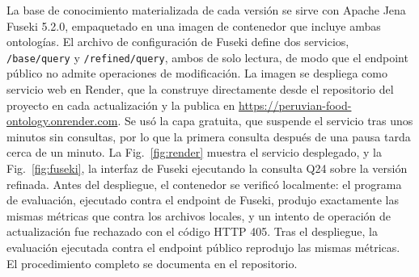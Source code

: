 \documentclass[conference]{IEEEtran}
\begin{document}
La base de conocimiento materializada de cada versión se sirve con Apache Jena Fuseki 5.2.0, empaquetado en una imagen de contenedor que incluye ambas ontologías. El archivo de configuración de Fuseki define dos servicios, \texttt{/base/query} y \texttt{/refined/query}, ambos de solo lectura, de modo que el endpoint público no admite operaciones de modificación. La imagen se despliega como servicio web en Render, que la construye directamente desde el repositorio del proyecto en cada actualización y la publica en \url{https://peruvian-food-ontology.onrender.com}. Se usó la capa gratuita, que suspende el servicio tras unos minutos sin consultas, por lo que la primera consulta después de una pausa tarda cerca de un minuto. La Fig.~\ref{fig:render} muestra el servicio desplegado, y la Fig.~\ref{fig:fuseki}, la interfaz de Fuseki ejecutando la consulta Q24 sobre la versión refinada. Antes del despliegue, el contenedor se verificó localmente: el programa de evaluación, ejecutado contra el endpoint de Fuseki, produjo exactamente las mismas métricas que contra los archivos locales, y un intento de operación de actualización fue rechazado con el código HTTP 405. Tras el despliegue, la evaluación ejecutada contra el endpoint público reprodujo las mismas métricas. El procedimiento completo se documenta en el repositorio.
\end{document}
